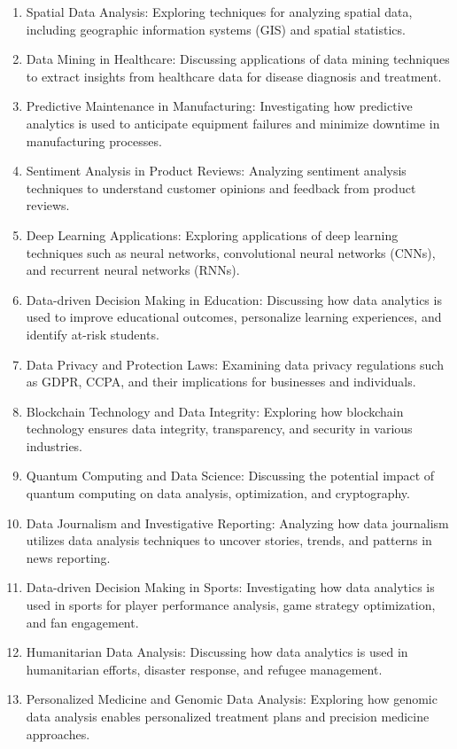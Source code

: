 \documentclass[12pt]{article}
\begin{document}
\begin{enumerate}
        \item Spatial Data Analysis: Exploring techniques for analyzing spatial data, including geographic information systems (GIS) and spatial statistics.
        \item Data Mining in Healthcare: Discussing applications of data mining techniques to extract insights from healthcare data for disease diagnosis and treatment. 
        \item Predictive Maintenance in Manufacturing: Investigating how predictive analytics is used to anticipate equipment failures and minimize downtime in manufacturing processes.
        \item Sentiment Analysis in Product Reviews: Analyzing sentiment analysis techniques to understand customer opinions and feedback from product reviews.
        \item Deep Learning Applications: Exploring applications of deep learning techniques such as neural networks, convolutional neural networks (CNNs), and recurrent neural networks (RNNs).
        \item Data-driven Decision Making in Education: Discussing how data analytics is used to improve educational outcomes, personalize learning experiences, and identify at-risk students.
        \item Data Privacy and Protection Laws: Examining data privacy regulations such as GDPR, CCPA, and their implications for businesses and individuals.
        \item Blockchain Technology and Data Integrity: Exploring how blockchain technology ensures data integrity, transparency, and security in various industries.
        \item Quantum Computing and Data Science: Discussing the potential impact of quantum computing on data analysis, optimization, and cryptography.
        \item Data Journalism and Investigative Reporting: Analyzing how data journalism utilizes data analysis techniques to uncover stories, trends, and patterns in news reporting.
        \item Data-driven Decision Making in Sports: Investigating how data analytics is used in sports for player performance analysis, game strategy optimization, and fan engagement.
        \item Humanitarian Data Analysis: Discussing how data analytics is used in humanitarian efforts, disaster response, and refugee management.
        \item Personalized Medicine and Genomic Data Analysis: Exploring how genomic data analysis enables personalized treatment plans and precision medicine approaches.

\end{enumerate}
\end{document}
